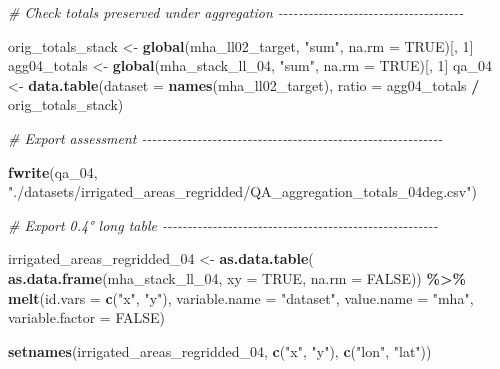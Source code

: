 \documentclass[
  11pt,
]{article}
\newenvironment{Shaded}{\begin{snugshade}}{\end{snugshade}}
\newcommand{\AttributeTok}[1]{\textcolor[rgb]{0.13,0.29,0.53}{#1}}
\newcommand{\CommentTok}[1]{\textcolor[rgb]{0.56,0.35,0.01}{\textit{#1}}}
\newcommand{\ConstantTok}[1]{\textcolor[rgb]{0.56,0.35,0.01}{#1}}
\newcommand{\DecValTok}[1]{\textcolor[rgb]{0.00,0.00,0.81}{#1}}
\newcommand{\FunctionTok}[1]{\textcolor[rgb]{0.13,0.29,0.53}{\textbf{#1}}}
\newcommand{\NormalTok}[1]{#1}
\newcommand{\OtherTok}[1]{\textcolor[rgb]{0.56,0.35,0.01}{#1}}
\newcommand{\SpecialCharTok}[1]{\textcolor[rgb]{0.81,0.36,0.00}{\textbf{#1}}}
\newcommand{\StringTok}[1]{\textcolor[rgb]{0.31,0.60,0.02}{#1}}
\begin{document}
\begin{Shaded}
\begin{Highlighting}[]
\CommentTok{\# Check totals preserved under aggregation {-}{-}{-}{-}{-}{-}{-}{-}{-}{-}{-}{-}{-}{-}{-}{-}{-}{-}{-}{-}{-}{-}{-}{-}{-}{-}{-}{-}{-}{-}{-}{-}{-}{-}{-}{-}{-}}

\NormalTok{orig\_totals\_stack }\OtherTok{\textless{}{-}} \FunctionTok{global}\NormalTok{(mha\_ll02\_target, }\StringTok{"sum"}\NormalTok{, }\AttributeTok{na.rm =} \ConstantTok{TRUE}\NormalTok{)[, }\DecValTok{1}\NormalTok{]}
\NormalTok{agg04\_totals }\OtherTok{\textless{}{-}} \FunctionTok{global}\NormalTok{(mha\_stack\_ll\_04, }\StringTok{"sum"}\NormalTok{, }\AttributeTok{na.rm =} \ConstantTok{TRUE}\NormalTok{)[, }\DecValTok{1}\NormalTok{]}
\NormalTok{qa\_04 }\OtherTok{\textless{}{-}} \FunctionTok{data.table}\NormalTok{(}\AttributeTok{dataset =} \FunctionTok{names}\NormalTok{(mha\_ll02\_target),}
                    \AttributeTok{ratio =}\NormalTok{ agg04\_totals }\SpecialCharTok{/}\NormalTok{ orig\_totals\_stack)}

\CommentTok{\# Export assessment {-}{-}{-}{-}{-}{-}{-}{-}{-}{-}{-}{-}{-}{-}{-}{-}{-}{-}{-}{-}{-}{-}{-}{-}{-}{-}{-}{-}{-}{-}{-}{-}{-}{-}{-}{-}{-}{-}{-}{-}{-}{-}{-}{-}{-}{-}{-}{-}{-}{-}{-}{-}{-}{-}{-}{-}{-}{-}{-}{-}}

\FunctionTok{fwrite}\NormalTok{(qa\_04,}
       \StringTok{"./datasets/irrigated\_areas\_regridded/QA\_aggregation\_totals\_04deg.csv"}\NormalTok{)}

\CommentTok{\# Export 0.4° long table {-}{-}{-}{-}{-}{-}{-}{-}{-}{-}{-}{-}{-}{-}{-}{-}{-}{-}{-}{-}{-}{-}{-}{-}{-}{-}{-}{-}{-}{-}{-}{-}{-}{-}{-}{-}{-}{-}{-}{-}{-}{-}{-}{-}{-}{-}{-}{-}{-}{-}{-}{-}{-}{-}{-}}

\NormalTok{irrigated\_areas\_regridded\_04 }\OtherTok{\textless{}{-}} \FunctionTok{as.data.table}\NormalTok{(}
  \FunctionTok{as.data.frame}\NormalTok{(mha\_stack\_ll\_04, }\AttributeTok{xy =} \ConstantTok{TRUE}\NormalTok{, }\AttributeTok{na.rm =} \ConstantTok{FALSE}\NormalTok{)) }\SpecialCharTok{\%\textgreater{}\%}
  \FunctionTok{melt}\NormalTok{(}\AttributeTok{id.vars =} \FunctionTok{c}\NormalTok{(}\StringTok{"x"}\NormalTok{, }\StringTok{"y"}\NormalTok{), }\AttributeTok{variable.name =} \StringTok{"dataset"}\NormalTok{, }\AttributeTok{value.name =} \StringTok{"mha"}\NormalTok{,}
       \AttributeTok{variable.factor =} \ConstantTok{FALSE}\NormalTok{)}

\FunctionTok{setnames}\NormalTok{(irrigated\_areas\_regridded\_04, }\FunctionTok{c}\NormalTok{(}\StringTok{"x"}\NormalTok{, }\StringTok{"y"}\NormalTok{), }\FunctionTok{c}\NormalTok{(}\StringTok{"lon"}\NormalTok{, }\StringTok{"lat"}\NormalTok{))}


\end{Highlighting}
\end{Shaded}
\end{document}
